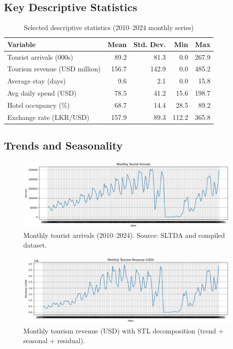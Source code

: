 \documentclass[12pt,a4paper]{article}
\begin{document}
\subsection{Key Descriptive Statistics}
\begin{table}[H]
\centering
\caption{Selected descriptive statistics (2010--2024 monthly series)}
\begin{tabular}{lrrrr}
\toprule
Variable & Mean & Std. Dev. & Min & Max \\
\midrule
Tourist arrivals (000s) & 89.2 & 81.3 & 0.0 & 267.9 \\
Tourism revenue (USD million) & 156.7 & 142.9 & 0.0 & 485.2 \\
Average stay (days) & 9.6 & 2.1 & 0.0 & 15.8 \\
Avg daily spend (USD) & 78.5 & 41.2 & 15.6 & 198.7 \\
Hotel occupancy (\%) & 68.7 & 14.4 & 28.5 & 89.2 \\
Exchange rate (LKR/USD) & 157.9 & 89.3 & 112.2 & 365.8 \\
\bottomrule
\end{tabular}
\end{table}

\subsection{Trends and Seasonality}
\begin{figure}[H]
  \centering
  \includegraphics[width=0.9\linewidth]{figure1.jpg}
  \caption{Monthly tourist arrivals (2010--2024). Source: SLTDA and compiled dataset.}
\end{figure}

\begin{figure}[H]
  \centering
  \includegraphics[width=0.9\linewidth]{figure2.jpg}
  \caption{Monthly tourism revenue (USD) with STL decomposition (trend + seasonal + residual).}
\end{figure}
\end{document}
